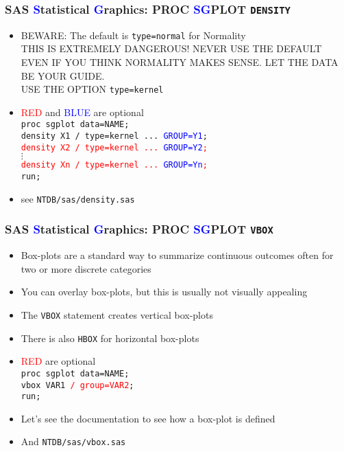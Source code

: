 \documentclass[11pt,pdftex,dvipsnames,usenames,helvetica]{beamer}
\begin{document}
\begin{frame}[fragile]
\frametitle{SAS \textcolor{blue}{S}tatistical \textcolor{blue}{G}raphics:
PROC \textcolor{blue}{SG}PLOT {\tt DENSITY}}
\begin{itemize}
\item BEWARE: The default is {\tt type=normal} for Normality\\
THIS IS EXTREMELY DANGEROUS! NEVER USE THE DEFAULT
  EVEN IF YOU THINK NORMALITY MAKES SENSE.  LET THE DATA BE YOUR GUIDE.\\
USE THE OPTION {\tt type=kernel} 
\item \textcolor{red}{RED} and \textcolor{blue}{BLUE} are optional\\
{\tt proc sgplot data=NAME;\\
density X1  / type=kernel ... \textcolor{blue}{GROUP=Y1};\\
\textcolor{red}{density X2 / type=kernel ... \textcolor{blue}{GROUP=Y2};}\\
$\vdots$\\
\textcolor{red}{density Xn / type=kernel ... \textcolor{blue}{GROUP=Yn};}\\
run;}
\item see {\tt NTDB/sas/density.sas}
\end{itemize}
\end{frame}

\begin{frame}[fragile]
\frametitle{SAS \textcolor{blue}{S}tatistical \textcolor{blue}{G}raphics:
PROC \textcolor{blue}{SG}PLOT {\tt VBOX}}
\begin{itemize}
\item Box-plots are a standard way to summarize continuous outcomes
often for two or more discrete categories
\item You can overlay box-plots, but this is usually not
visually appealing
\item The {\tt VBOX} statement creates vertical box-plots
\item There is also {\tt HBOX} for horizontal box-plots
\item \textcolor{red}{RED} are optional\\
{\tt proc sgplot data=NAME;\\
vbox VAR1 \textcolor{red}{/ group=VAR2};\\
run;}
\item Let's see the documentation to see how a box-plot is defined
\item And {\tt NTDB/sas/vbox.sas}
\end{itemize}
\end{frame}
\end{document}
